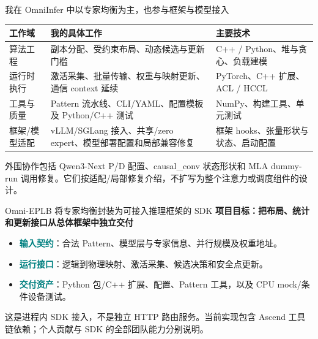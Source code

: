 \documentclass[aspectratio=169,10pt]{beamer}
\newcommand{\src}[1]{\vfill{\fontsize{6.7}{8}\selectfont\color{Muted}#1}\par}
\newcommand{\lead}[1]{{\color{Teal}\large\bfseries #1}\par\medskip}
\newcommand{\term}[1]{\textcolor{Teal}{\textbf{#1}}}
\begin{document}
\begin{frame}{我在 OmniInfer 中以专家均衡为主，也参与框架与模型接入}
\renewcommand{\arraystretch}{1.5}
\begin{tabularx}{\textwidth}{@{}p{2.4cm}Yp{3cm}@{}}
\toprule 工作域 & 我的具体工作 & 主要技术 \\
\midrule
算法工程 & 副本分配、受约束布局、动态候选与更新门槛 & C++ / Python、堆与贪心、负载建模 \\
运行时执行 & 激活采集、批量传输、权重与映射更新、通信 context 延续 & PyTorch、C++ 扩展、ACL / HCCL \\
工具与质量 & Pattern 流水线、CLI/YAML、配置模板及 Python/C++ 测试 & NumPy、构建工具、单元测试 \\
框架/模型适配 & vLLM/SGLang 接入、共享/zero expert、模型部署配置和局部兼容修复 & 框架 hooks、张量形状与状态、启动配置 \\
\bottomrule
\end{tabularx}
\src{外围协作包括 Qwen3-Next P/D 配置、causal\_conv 状态形状和 MLA dummy-run 调用修复。它们按适配/局部修复介绍，不扩写为整个注意力或调度组件的设计。}
\end{frame}

\begin{frame}{Omni-EPLB 将专家均衡封装为可接入推理框架的 SDK}
\lead{项目目标：把布局、统计和更新接口从总体框架中独立交付}
\begin{center}
\end{center}
\begin{itemize}
\item \term{输入契约}：合法 Pattern、模型层与专家信息、并行规模及权重地址。
\item \term{运行接口}：逻辑到物理映射、激活采集、候选决策和安全点更新。
\item \term{交付资产}：Python 包/C++ 扩展、配置、Pattern 工具，以及 CPU mock/条件设备测试。
\end{itemize}
\src{这是进程内 SDK 接入，不是独立 HTTP 路由服务。当前实现包含 Ascend 工具链依赖；个人贡献与 SDK 的全部团队能力分别说明。}
\end{frame}
\end{document}
